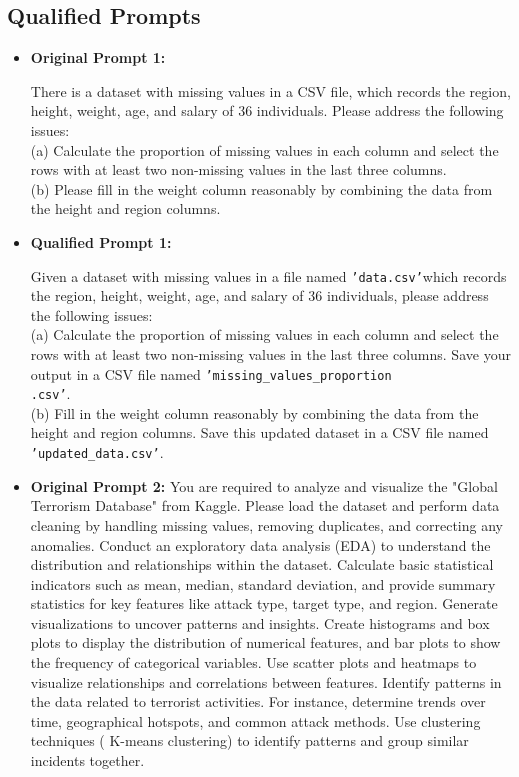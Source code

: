 \subsection{Qualified Prompts}
\begin{itemize}
    \item \textbf{Original Prompt 1:}    

There is a dataset with missing values in a CSV file, which records the region, height, weight, age, and salary of 36 individuals. Please address the following issues: \\(a) Calculate the proportion of missing values in each column and select the rows with at least two non-missing values in the last three columns. \\(b) Please fill in the weight column reasonably by combining the data from the height and region columns.
    
    \item \textbf{Qualified Prompt 1:}

\begin{tcolorbox}[colback=blue!5!white, colframe=blue!75!black, title=Qualified Prompt 1:]
Given a dataset with missing values in a file named \texttt{'data.csv'}which records the region, height, weight, age, and salary of 36 individuals, please address the following issues:\\
(a) Calculate the proportion of missing values in each column and select the rows with at least two non-missing values in the last three columns. Save your output in a CSV file named \texttt{'missing\_values\_proportion\\.csv'}.\\
(b) Fill in the weight column reasonably by combining the data from the height and region columns. Save this updated dataset in a CSV file named \texttt{'updated\_data.csv'}.
\end{tcolorbox}

\item \textbf{Original Prompt 2:}
You are required to analyze and visualize the "Global Terrorism Database" from Kaggle. Please load the dataset and perform data cleaning by handling missing values, removing duplicates, and correcting any anomalies. Conduct an exploratory data analysis (EDA) to understand the distribution and relationships within the dataset. Calculate basic statistical indicators such as mean, median, standard deviation, and provide summary statistics for key features like attack type, target type, and region. Generate visualizations to uncover patterns and insights. Create histograms and box plots to display the distribution of numerical features, and bar plots to show the frequency of categorical variables. Use scatter plots and heatmaps to visualize relationships and correlations between features. Identify patterns in the data related to terrorist activities. For instance, determine trends over time, geographical hotspots, and common attack methods. Use clustering techniques ( K-means clustering) to identify patterns and group similar incidents together.
  


\end{itemize}
